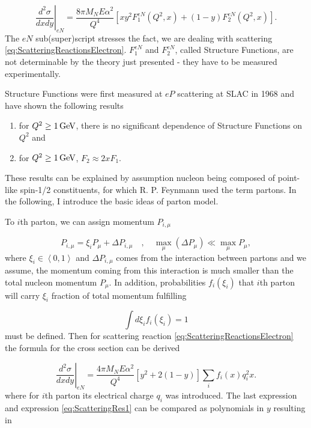 \begin{equation}
  \left. \frac{d^2\sigma}{dxdy} \right|_{eN} =
  \frac{8 \pi M_N E \alpha^2}{Q^4} \left[ x y^2 F_1^{eN}(Q^2, x)
  + (1-y) F_2^{eN}(Q^2,x) \right].
  \label{eq:ScatteringRes1}
\end{equation}
The $eN$ sub(super)script stresses the fact, we are dealing with scattering
\eqref{eq:ScatteringReactionsElectron}. 
$F_1^{eN}$ and $F_2^{eN}$, called Structure Functions, are not determinable by
the theory just presented - they have to be measured experimentally.

Structure Functions were first measured at $eP$ scattering at SLAC in 1968
\cite{ePScattering} and have shown the following results
\begin{enumerate}
  \item for $Q^2 \geq 1\,\text{GeV}$, there is no significant dependence of Structure
    Functions on $Q^2$ and
  \item for $Q^2 \geq 1\,\text{GeV}$, $F_2 \approx 2xF_1$.
\end{enumerate}
These results can be explained by assumption nucleon being composed of
point-like spin-1/2 constituents, for which R. P. Feynmann used the term
partons. In the following, I introduce the basic ideas of parton model. 

To $i$th parton, we can assign momentum $P_{i,\mu}$

\begin{equation}
  P_{i,\mu} = \xi_i P_\mu + \Delta P_{i,\mu} 
    \quad , \quad \max_\mu (\Delta P_\mu) \ll \max_\mu P_\mu,
  \label{PartonsMomentumDistriburtionAssumption}
\end{equation}
where $\xi_i \in \left< 0, 1 \right>$ and $\Delta P_{i,\mu}$ comes from the
interaction between partons and we assume, the momentum coming from this
interaction is much smaller than the total nucleon momentum $P_\mu$. In
addition, probabilities $f_i(\xi_i)$ that $i$th parton will carry $\xi_i$
fraction of total momentum fulfilling

\begin{equation}
  \int d\xi_i f_i(\xi_i) = 1
  \label{eq:PartonDensityFunctionsNormalization}
\end{equation}
must be defined. Then for scattering reaction
\eqref{eq:ScatteringReactionsElectron} the formula for the cross section
can be derived

\begin{equation}
  \left. \frac{d^2\sigma}{dxdy} \right|_{eN} =
  \frac{4 \pi M_N E \alpha^2}{Q^4} \left[ y^2 + 2 ( 1 - y ) \right]
  \sum_i f_i(x) q_i^2 x.
  \label{eg:ScatteringRes2}
\end{equation}
where for $i$th parton its electrical charge $q_i$ was introduced. The last
expression and expression \eqref{eq:ScatteringRes1} can be compared as polynomials in $y$
resulting in

